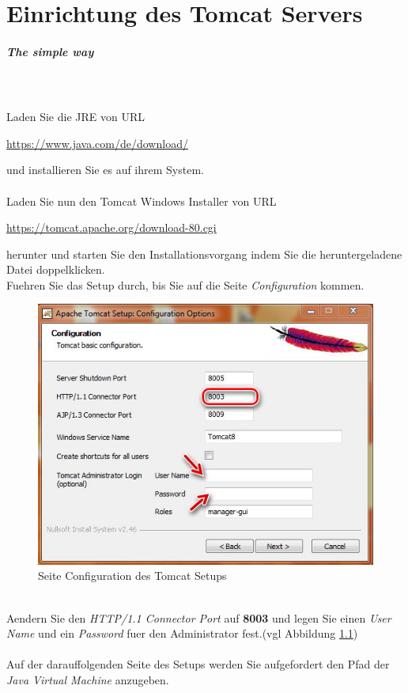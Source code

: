\documentclass[a4paper, 12pt]{scrreprt}
\begin{document}
\chapter{Einrichtung des Tomcat Servers}
\paragraph{The simple way}\ \\
\ \\
Laden Sie die JRE von URL
\begin{center}
	 \url{https://www.java.com/de/download/}
\end{center}
und installieren Sie es auf ihrem System.\ \\
\ \\
Laden Sie nun den Tomcat Windows Installer von URL 
\begin{center}
	\url{https://tomcat.apache.org/download-80.cgi}
\end{center}
herunter und starten Sie den Installationsvorgang indem Sie die heruntergeladene Datei doppelklicken.\\
Fuehren Sie das Setup durch, bis Sie auf die Seite {\it Configuration} kommen.
\begin{figure}[h]
\centering
\includegraphics[width=0.75\linewidth]{Grafiken/TomcatInstall1}
\caption{Seite Configuration des Tomcat Setups}
\label{fig:TomcatInstall1}
\end{figure}\\
Aendern Sie den {\it HTTP/1.1 Connector Port} auf \textbf{8003} und legen Sie einen {\it User Name} und ein {\it Password} fuer den Administrator fest.(vgl Abbildung \ref{fig:TomcatInstall1})\\
\ \\
Auf der darauffolgenden Seite des Setups werden Sie aufgefordert den Pfad der {\it Java Virtual Machine} anzugeben.\\
\end{document}

